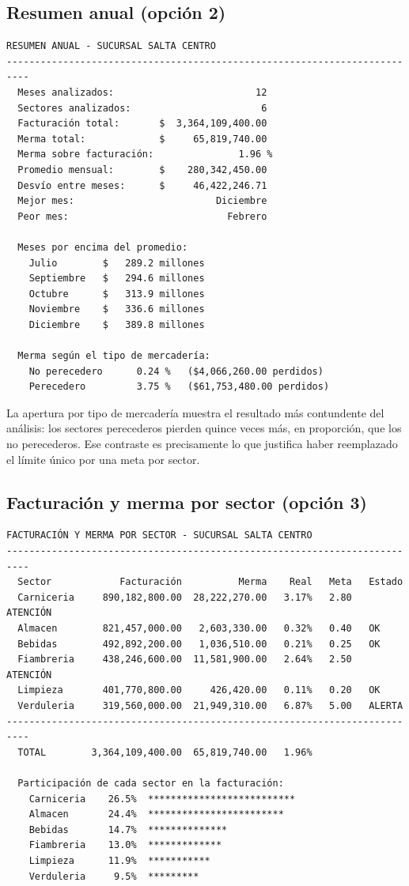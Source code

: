 \documentclass[12pt]{article}
\begin{document}
\newpage

\subsection{Resumen anual (opción 2)}

\begin{lstlisting}[style=salida]
RESUMEN ANUAL - SUCURSAL SALTA CENTRO
--------------------------------------------------------------------------
  Meses analizados:                         12
  Sectores analizados:                       6
  Facturación total:       $  3,364,109,400.00
  Merma total:             $     65,819,740.00
  Merma sobre facturación:               1.96 %
  Promedio mensual:        $    280,342,450.00
  Desvío entre meses:      $     46,422,246.71
  Mejor mes:                         Diciembre
  Peor mes:                            Febrero

  Meses por encima del promedio:
    Julio        $   289.2 millones
    Septiembre   $   294.6 millones
    Octubre      $   313.9 millones
    Noviembre    $   336.6 millones
    Diciembre    $   389.8 millones

  Merma según el tipo de mercadería:
    No perecedero      0.24 %   ($4,066,260.00 perdidos)
    Perecedero         3.75 %   ($61,753,480.00 perdidos)
\end{lstlisting}

La apertura por tipo de mercadería muestra el resultado más contundente del análisis: los sectores perecederos pierden quince veces más, en proporción, que los no perecederos. Ese contraste es precisamente lo que justifica haber reemplazado el límite único por una meta por sector.

\subsection{Facturación y merma por sector (opción 3)}

\begin{lstlisting}[style=salida]
FACTURACIÓN Y MERMA POR SECTOR - SUCURSAL SALTA CENTRO
--------------------------------------------------------------------------
  Sector            Facturación          Merma    Real   Meta   Estado
  Carniceria     890,182,800.00  28,222,270.00   3.17%   2.80   ATENCIÓN
  Almacen        821,457,000.00   2,603,330.00   0.32%   0.40   OK
  Bebidas        492,892,200.00   1,036,510.00   0.21%   0.25   OK
  Fiambreria     438,246,600.00  11,581,900.00   2.64%   2.50   ATENCIÓN
  Limpieza       401,770,800.00     426,420.00   0.11%   0.20   OK
  Verduleria     319,560,000.00  21,949,310.00   6.87%   5.00   ALERTA
--------------------------------------------------------------------------
  TOTAL        3,364,109,400.00  65,819,740.00   1.96%

  Participación de cada sector en la facturación:
    Carniceria    26.5%  **************************
    Almacen       24.4%  ************************
    Bebidas       14.7%  **************
    Fiambreria    13.0%  *************
    Limpieza      11.9%  ***********
    Verduleria     9.5%  *********
\end{lstlisting}
\end{document}
